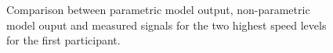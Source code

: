  \begin{figure}
    \centering
    \begin{subfigure}[b]{\textwidth}
        \centering
        \caption{}
        \label{fig:model3}
    \end{subfigure}
    \begin{subfigure}[b]{\textwidth}
        \centering
        \caption{}            
        \label{fig:model4}
    \end{subfigure}
    \caption{Comparison between parametric model output, non-parametric model ouput and measured signals for the two highest speed levels for the first participant.}
    \label{fig:model34}
 \end{figure}

